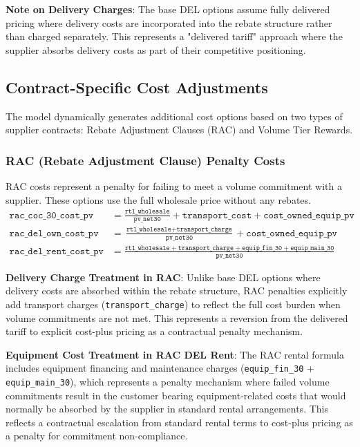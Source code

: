 \textbf{Note on Delivery Charges}: The base DEL options assume fully delivered pricing where delivery costs are incorporated into the rebate structure rather than charged separately. This represents a "delivered tariff" approach where the supplier absorbs delivery costs as part of their competitive positioning.

\subsection{Contract-Specific Cost Adjustments}
The model dynamically generates additional cost options based on two types of supplier contracts: Rebate Adjustment Clauses (RAC) and Volume Tier Rewards.

\subsubsection{RAC (Rebate Adjustment Clause) Penalty Costs}
RAC costs represent a penalty for failing to meet a volume commitment with a supplier. These options use the full wholesale price without any rebates.
\begin{align}
    \texttt{rac\_coc\_30\_cost\_pv} &= \frac{\texttt{rtl\_wholesale}}{\texttt{pv\_net30}} + \texttt{transport\_cost} + \texttt{cost\_owned\_equip\_pv} \\
    \texttt{rac\_del\_own\_cost\_pv} &= \frac{\texttt{rtl\_wholesale} + \texttt{transport\_charge}}{\texttt{pv\_net30}} + \texttt{cost\_owned\_equip\_pv} \\
    \texttt{rac\_del\_rent\_cost\_pv} &= \frac{\texttt{rtl\_wholesale} + \texttt{transport\_charge} + \texttt{equip\_fin\_30} + \texttt{equip\_main\_30}}{\texttt{pv\_net30}}
\end{align}

\textbf{Delivery Charge Treatment in RAC}: Unlike base DEL options where delivery costs are absorbed within the rebate structure, RAC penalties explicitly add transport charges (\texttt{transport\_charge}) to reflect the full cost burden when volume commitments are not met. This represents a reversion from the delivered tariff to explicit cost-plus pricing as a contractual penalty mechanism.

\textbf{Equipment Cost Treatment in RAC DEL Rent}: The RAC rental formula includes equipment financing and maintenance charges (\texttt{equip\_fin\_30} + \texttt{equip\_main\_30}), which represents a penalty mechanism where failed volume commitments result in the customer bearing equipment-related costs that would normally be absorbed by the supplier in standard rental arrangements. This reflects a contractual escalation from standard rental terms to cost-plus pricing as a penalty for commitment non-compliance.

